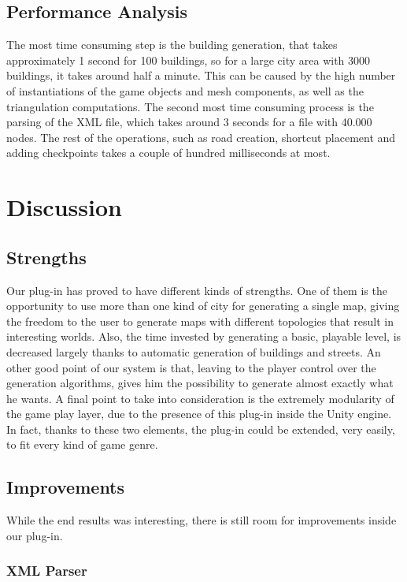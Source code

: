 \documentclass[conference]{IEEEtran}
\begin{document}
\subsection{Performance Analysis}

The most time consuming step is the building generation, that takes approximately 1 second for 100 buildings, so for a large city area with 3000 buildings, it takes around half a minute. This can be caused by the high number of instantiations of the game objects and mesh components, as well as the triangulation computations. The second most time consuming process is the parsing of the XML file, which takes around 3 seconds for a file with 40.000 nodes. The rest of the operations, such as road creation, shortcut placement and adding checkpoints takes a couple of hundred milliseconds at most.

\section{Discussion}

\subsection{Strengths}

Our plug-in has proved to have different kinds of strengths. One of them is the opportunity to use more than one kind of city for generating a single map, giving the freedom to the user to generate maps with different topologies that result in interesting worlds. Also, the time invested by generating a basic, playable level, is decreased largely thanks to automatic generation of buildings and streets. An other good point of our system is that, leaving to the player control over the generation algorithms, gives him the possibility to generate almost exactly what he wants. A final point to take into consideration is the extremely modularity of the game play layer, due to the presence of this plug-in inside the Unity engine. In fact, thanks to these two elements, the plug-in could be extended, very easily, to fit every kind of game genre. 

\subsection{Improvements}

While the end results was interesting, there is still room for improvements inside our plug-in.

\subsubsection{XML Parser}
\end{document}
